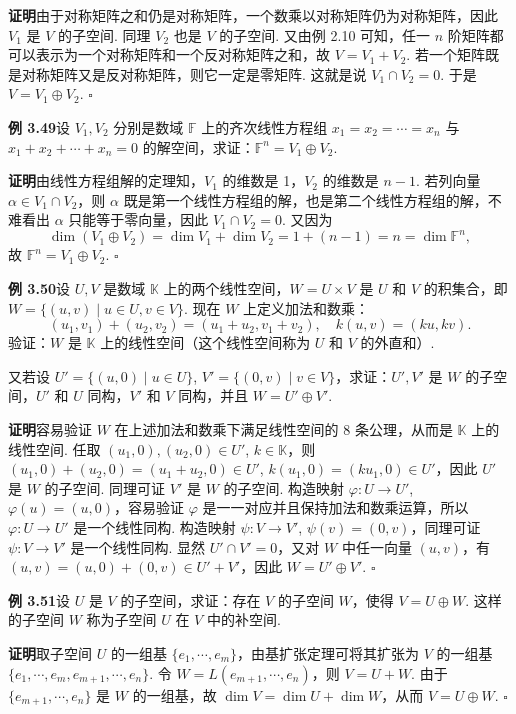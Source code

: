 \documentclass[UTF8,12pt,a4paper,fontset=fandol]{ctexart}
\begin{document}
\noindent\textbf{证明}\quad 由于对称矩阵之和仍是对称矩阵，一个数乘以对称矩阵仍为对称矩阵，因此 $V_1$ 是 $V$ 的子空间. 同理 $V_2$ 也是 $V$ 的子空间. 又由例 2.10 可知，任一 $n$ 阶矩阵都可以表示为一个对称矩阵和一个反对称矩阵之和，故 $V=V_1+V_2$. 若一个矩阵既是对称矩阵又是反对称矩阵，则它一定是零矩阵. 这就是说 $V_1\cap V_2=0$. 于是 $V=V_1\oplus V_2$. $\square$

\noindent\textbf{例 3.49}\quad 设 $V_1,V_2$ 分别是数域 $\mathbb{F}$ 上的齐次线性方程组 $x_1=x_2=\cdots=x_n$ 与 $x_1+x_2+\cdots+x_n=0$ 的解空间，求证：$\mathbb{F}^n=V_1\oplus V_2$.

\noindent\textbf{证明}\quad 由线性方程组解的定理知，$V_1$ 的维数是 1，$V_2$ 的维数是 $n-1$. 若列向量 $\alpha\in V_1\cap V_2$，则 $\alpha$ 既是第一个线性方程组的解，也是第二个线性方程组的解，不难看出 $\alpha$ 只能等于零向量，因此 $V_1\cap V_2=0$. 又因为
\[
\dim(V_1\oplus V_2)=\dim V_1+\dim V_2=1+(n-1)=n=\dim\mathbb{F}^n,
\]
故 $\mathbb{F}^n=V_1\oplus V_2$. $\square$

\noindent\textbf{例 3.50}\quad 设 $U,V$ 是数域 $\mathbb{K}$ 上的两个线性空间，$W=U\times V$ 是 $U$ 和 $V$ 的积集合，即 $W=\{(u,v)\mid u\in U,v\in V\}$. 现在 $W$ 上定义加法和数乘：
\[
(u_1,v_1)+(u_2,v_2)=(u_1+u_2,v_1+v_2),\quad k(u,v)=(ku,kv).
\]
验证：$W$ 是 $\mathbb{K}$ 上的线性空间（这个线性空间称为 $U$ 和 $V$ 的外直和）.

又若设 $U'=\{(u,0)\mid u\in U\}$, $V'=\{(0,v)\mid v\in V\}$，求证：$U',V'$ 是 $W$ 的子空间，$U'$ 和 $U$ 同构，$V'$ 和 $V$ 同构，并且 $W=U'\oplus V'$.

\noindent\textbf{证明}\quad 容易验证 $W$ 在上述加法和数乘下满足线性空间的 8 条公理，从而是 $\mathbb{K}$ 上的线性空间. 任取 $(u_1,0),(u_2,0)\in U'$, $k\in\mathbb{K}$，则 $(u_1,0)+(u_2,0)=(u_1+u_2,0)\in U'$, $k(u_1,0)=(ku_1,0)\in U'$，因此 $U'$ 是 $W$ 的子空间. 同理可证 $V'$ 是 $W$ 的子空间. 构造映射 $\varphi:U\to U'$, $\varphi(u)=(u,0)$，容易验证 $\varphi$ 是一一对应并且保持加法和数乘运算，所以 $\varphi:U\to U'$ 是一个线性同构. 构造映射 $\psi:V\to V'$, $\psi(v)=(0,v)$，同理可证 $\psi:V\to V'$ 是一个线性同构. 显然 $U'\cap V'=0$，又对 $W$ 中任一向量 $(u,v)$，有 $(u,v)=(u,0)+(0,v)\in U'+V'$，因此 $W=U'\oplus V'$. $\square$

\noindent\textbf{例 3.51}\quad 设 $U$ 是 $V$ 的子空间，求证：存在 $V$ 的子空间 $W$，使得 $V=U\oplus W$. 这样的子空间 $W$ 称为子空间 $U$ 在 $V$ 中的补空间.

\noindent\textbf{证明}\quad 取子空间 $U$ 的一组基 $\{e_1,\cdots,e_m\}$，由基扩张定理可将其扩张为 $V$ 的一组基 $\{e_1,\cdots,e_m,e_{m+1},\cdots,e_n\}$. 令 $W=L(e_{m+1},\cdots,e_n)$，则 $V=U+W$. 由于 $\{e_{m+1},\cdots,e_n\}$ 是 $W$ 的一组基，故 $\dim V=\dim U+\dim W$，从而 $V=U\oplus W$. $\square$
\end{document}

